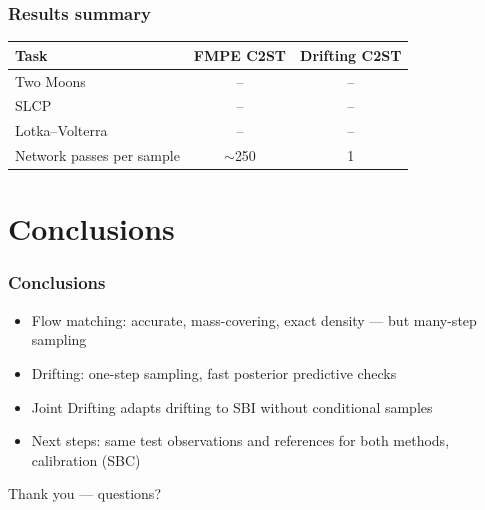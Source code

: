\documentclass[handout]{beamer}
\begin{document}
\begin{frame}
	\frametitle{Results summary}
	\begin{table}
		\centering
		\begin{tabular}{lcc}
			\toprule
			Task & FMPE C2ST & Drifting C2ST \\
			\midrule
			Two Moons      & -- & -- \\
			SLCP           & -- & -- \\
			Lotka--Volterra & -- & -- \\
			\midrule
			Network passes per sample & $\sim$250 & 1 \\
			\bottomrule
		\end{tabular}
	\end{table}
\end{frame}


\section{Conclusions}

\begin{frame}
	\frametitle{Conclusions}
	\begin{itemize}
		\item Flow matching: accurate, mass-covering, exact density --- but many-step sampling
		\item Drifting: one-step sampling, fast posterior predictive checks
		\item Joint Drifting adapts drifting to SBI without conditional samples
		\item Next steps: same test observations and references for both methods, calibration (SBC)
	\end{itemize}
\end{frame}

\begin{frame}
	\centering
	\Large Thank you --- questions?
\end{frame}
\end{document}
